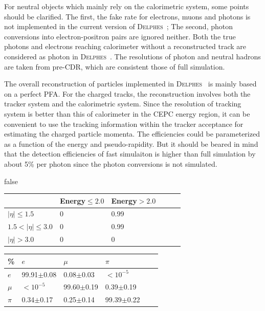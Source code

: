 \documentclass[a4paper,10pt,twoside]{cpc-hepnp}
\begin{document}
For neutral objects which mainly rely on the calorimetric system, some points should be clarified.
The first, the fake rate for electrons, muons and photons is not implemented in the current version of {\textsc{Delphes}~};
The second, photon conversions into electron-positron pairs are ignored neither.
Both the true photons and electrons reaching calorimeter without a reconstructed track are considered as photon in {\textsc{Delphes}~}.
The resolutions of photon and neutral hadrons are taken from pre-CDR, which are consistent those of full simulation.

The overall reconstruction of particles implemented in {\textsc{Delphes}~} is mainly based on a perfect PFA.
For the charged tracks, the reconstruction involves both the tracker system and the calorimetric system.
Since the resolution of tracking system is better than this of calorimeter in the CEPC energy region,
it can be convenient to use the tracking information within the tracker acceptance for estimating the charged particle momenta.
The efficiencies could be parameterized as a function of the energy and pseudo-rapidity. But it should be beared in mind
that the detection efficiencies of fast simulaiton is higher than full simulation by about 5\% per photon
since the photon conversions is not simulated.   


\if false
\begin{center}
\begin{tabular}{@{}*{3}{ll}}
\hline \hline
		& Energy$\le2.0$ & Energy$>2.0$ \\ \hline\hline
$|\eta|\le1.5$  & 0 		     & 0.99 \\
$1.5<|\eta|\le3.0$    & 0 	     & 0.99 \\
$|\eta|>3.0$  & 0 		     & 0      \\
\hline \hline
\end{tabular}
\end{center}

\begin{center}
\begin{tabular}{@{}*{3}{ll}}
\hline \hline
\%	    & $e$ & $\mu$ & $\pi$ \\ \hline\hline
$e$      & 99.91$\pm$0.08  & 0.08$\pm$0.03   & $<10^{-5}$ \\
$\mu$  & $<10^{-5}$ 	      & 99.60$\pm$0.19 & 0.39$\pm$0.19 \\
$\pi$    & 0.34$\pm$0.17    & 0.25$\pm$0.14   & 99.39$\pm$0.22  \\
\hline \hline
\end{tabular}
\end{center}
\fi
\end{document}

